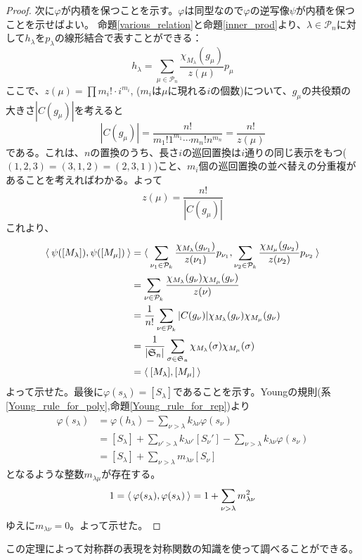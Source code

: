 \documentclass{ltjsreport}
\begin{document}
\begin{proof}
  次に$\varphi$が内積を保つことを示す。$\varphi$は同型なので$\varphi$の逆写像$\psi$が内積を保つことを示せばよい。
  命題\ref{various_relation}と命題\ref{inner_prod}より、$\lambda\in\mathcal{P}_n$に対して$h_\lambda$を$p_\lambda$の線形結合で表すことができる：
  \[
  h_\lambda=\sum_{\mu\in\mathcal{P}_n}\frac{\chi_{M_\lambda}(g_\mu)}{z(\mu)}p_\mu  
  \]
  ここで、$z(\mu)=\prod m_i!\cdot i^{m_i}$, ($m_i$は$\mu$に現れる$i$の個数)について、$g_\mu$の共役類の大きさ$|C(g_\mu)|$を考えると
  \[
  |C(g_\mu)|=\frac{n!}{m_1!1^{m_1}\cdots m_n!n^{m_n}}=\frac{n!}{z(\mu)}
  \]
  である。これは、$n$の置換のうち、長さ$i$の巡回置換は$i$通りの同じ表示をもつ($(1,2,3)=(3,1,2)=(2,3,1)$)こと、$m_i$個の巡回置換の並べ替えの分重複があることを考えればわかる。よって
  \[
  z(\mu)=\frac{n!}{|C(g_\mu)|}
  \]
  これより、
  \begin{align*}
    \langle\:\psi([M_{\lambda}]),\psi([M_\mu])\:\rangle
    &=\langle\:\sum_{\nu_1\in\mathcal{P}_k}\frac{\chi_{M_\lambda}(g_{\nu_1})}{z(\nu_1)}p_{\nu_1},\sum_{\nu_2\in\mathcal{P}_k}\frac{\chi_{M_\mu}(g_{\nu_2})}{z(\nu_2)}p_{\nu_2}\:\rangle\\
    &=\sum_{\nu\in\mathcal{P}_k}\frac{\chi_{M_\lambda}(g_\nu)\chi_{M_\mu}(g_\nu)}{z(\nu)}\\
    &=\frac{1}{n!}\sum_{\nu\in\mathcal{P}_k}
    |C(g_\nu)|\chi_{M_\lambda}(g_\nu)\chi_{M_\mu}(g_\nu)\\
    &=\frac{1}{|\mathfrak{S}_n|}
    \sum_{\sigma\in\mathfrak{S_n}}\chi_{M_\lambda}(\sigma)\chi_{M_\mu}(\sigma)\\
    &=\langle\:[M_\lambda],[M_\mu]\:\rangle
  \end{align*}
  よって示せた。最後に$\varphi(s_\lambda)=[S_\lambda]$であることを示す。Youngの規則(系\ref{Young_rule_for_poly},命題\ref{Young_rule_for_rep})より
  \begin{align*}
  \varphi(s_\lambda)&=\varphi(h_\lambda)-\sum_{\nu>\lambda}k_{\lambda\nu}\varphi(s_\nu)\\
  &=[S_\lambda]+\sum_{\nu'>\lambda}k_{\lambda\nu'}[S_\nu']-\sum_{\nu>\lambda}k_{\lambda\nu}\varphi(s_\nu)\\
  &=[S_\lambda]+\sum_{\nu>\lambda}m_{\lambda\nu}[S_\nu]
  \end{align*}
  となるような整数$m_{\lambda\mu}$が存在する。
  \[
  1=\langle\:\varphi(s_\lambda),\varphi(s_\lambda)\:\rangle=1+\sum_{\nu>\lambda}m_{\lambda\nu}^2
  \]
  ゆえに$m_{\lambda\nu}=0$。よって示せた。
\end{proof}



この定理によって対称群の表現を対称関数の知識を使って調べることができる。
\end{document}

